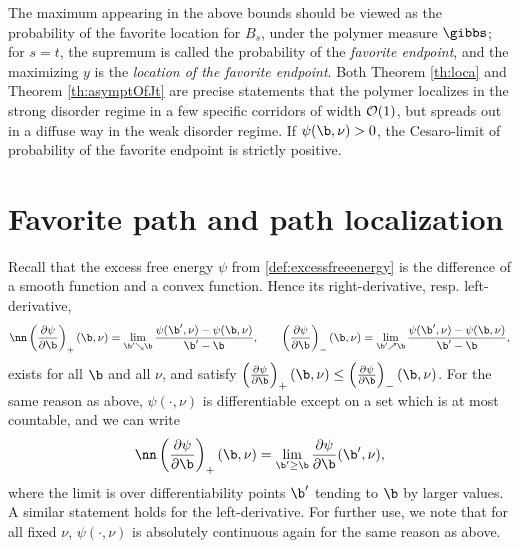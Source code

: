 The maximum appearing in the above bounds should be viewed as the probability of the favorite location for $B_s$, under the polymer measure $\gibbs$; for $s=t$, the supremum is called the probability of the \emph{favorite endpoint}, and the maximizing $y$ is
the \emph{location of the favorite endpoint}.
Both Theorem \ref{th:loca} and Theorem \ref{th:asymptOfJt} are precise statements that the polymer localizes in the strong disorder
regime in a few specific corridors of width ${\cal O}(1)$, but spreads out in a diffuse way in the
weak disorder regime. If $\psi(\b,\nu)>0$, the Cesaro-limit of  probability of the {favorite endpoint} is strictly positive.


\section{Favorite path and path localization}



%
%
Recall that the excess free energy $\psi$ from 
\eqref{def:excessfreeenergy} is the difference of a smooth function and a convex function. Hence its right-derivative, resp. left-derivative, 
\begin{equation}\nn
 \left( \frac{\partial \psi}{\partial \b}\right)_+ (\b,\nu) = \lim_{\b' \searrow \b} \frac{\psi(\b',\nu)-\psi(\b,\nu)}{\b'-\b}, \qquad
 \left(   \frac{\partial \psi}{\partial \b}\right)_- (\b,\nu) = \lim_{\b' \nearrow \b} \frac{\psi(\b',\nu)-\psi(\b,\nu)}{\b'-\b},
\end{equation}
exists for all $\b$ and all $\nu$, and satisfy 
$ \left( \frac{\partial \psi}{\partial \b}\right)_+ (\b,\nu) \leq  \left(\frac{\partial \psi}{\partial \b}\right)_- (\b,\nu)$. For the same reason as above, $\psi(\cdot,\nu)$ is differentiable except on a set
which is at most countable, and we can write
 \begin{equation}\nn
 \left(  \frac{\partial \psi}{\partial \b}\right)_+ (\b,\nu) = \lim_{\b'\geq \b } 
  \frac{\partial \psi}{\partial \b} (\b',\nu) ,
\end{equation}
where the limit is over differentiability points $\b'$ tending to $\b$ by larger values. A similar statement holds for the left-derivative.
For further use, we note that for all fixed $\nu$, $\psi(\cdot, \nu)$ is absolutely continuous again for the same reason as above.

